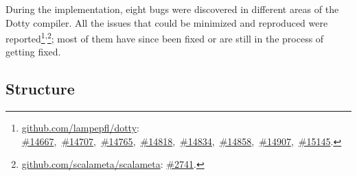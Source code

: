 During the implementation, eight bugs were discovered in different areas of the Dotty compiler. All the issues that could be minimized and reproduced were reported\footnote{
\href{https://github.com/lampepfl/dotty}{github.com/lampepfl/dotty}:
\href{https://github.com/lampepfl/dotty/issues/14667}{\#14667},\
\href{https://github.com/lampepfl/dotty/issues/14707}{\#14707},\
\href{https://github.com/lampepfl/dotty/issues/14765}{\#14765},\
\href{https://github.com/lampepfl/dotty/issues/14818}{\#14818},\
\href{https://github.com/lampepfl/dotty/issues/14834}{\#14834},\
\href{https://github.com/lampepfl/dotty/issues/14858}{\#14858},\
\href{https://github.com/lampepfl/dotty/issues/14907}{\#14907},\
\href{https://github.com/lampepfl/dotty/issues/15145}{\#15145}.
}\textsuperscript{,}\footnote{
\href{https://github.com/scalameta/scalameta}{github.com/scalameta/scalameta}:
\href{https://github.com/scalameta/scalameta/issues/2741}{\#2741}.
}; most of them have since been fixed or are still in the process of getting fixed.

\subsection{Structure}

